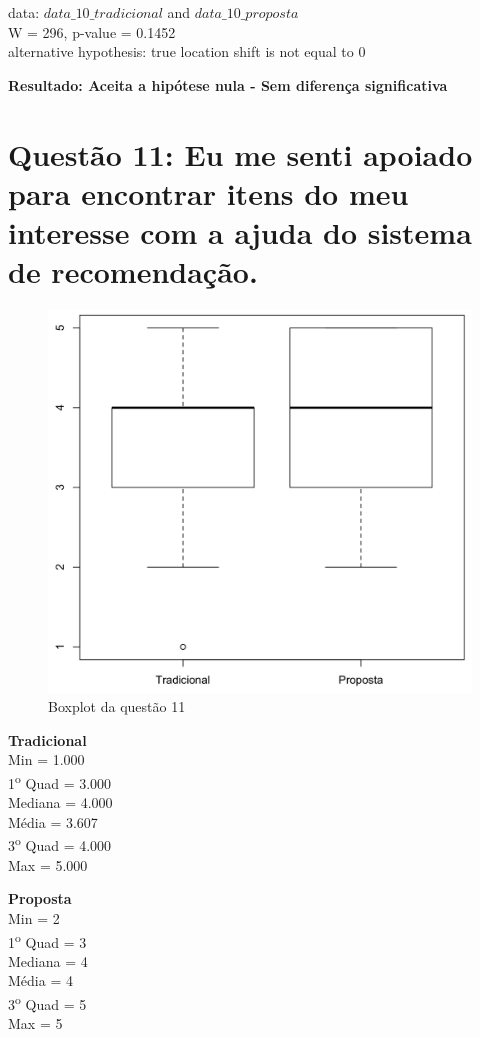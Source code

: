 \noindent
data:  $data\_10\_tradicional$ and $data\_10\_proposta$\\
W = 296, p-value = 0.1452\\
alternative hypothesis: true location shift is not equal to 0

\noindent
\textbf{Resultado: Aceita a hipótese nula - Sem diferença significativa}

\newpage
\section{Questão 11: Eu me senti apoiado para encontrar itens do meu interesse com a ajuda do sistema de recomendação.}

\begin{figure}[htb]
  \caption{\label{fig:questao11-boxplot}Boxplot da questão 11}
  \begin{center}
      \includegraphics[scale=0.4]{./Figuras/questao11-boxplot.png}
  \end{center}
\end{figure}

\begin{multicols}{2}

\noindent\textbf{Tradicional}\\
Min = 1.000\\
1\textsuperscript{o} Quad = 3.000\\
Mediana = 4.000\\
Média = 3.607\\
3\textsuperscript{o} Quad = 4.000\\
Max = 5.000\\
\columnbreak

\noindent\textbf{Proposta}\\
Min = 2\\
1\textsuperscript{o} Quad = 3\\
Mediana = 4\\
Média = 4\\
3\textsuperscript{o} Quad = 5\\
Max = 5
\end{multicols}

